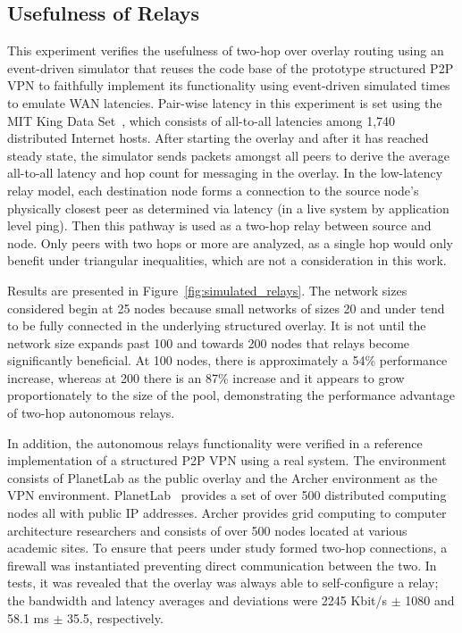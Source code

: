 \subsection{Usefulness of Relays}
This experiment verifies the usefulness of two-hop over overlay routing using
an event-driven simulator that reuses the code base of the prototype structured
P2P VPN to faithfully implement its functionality using event-driven simulated
times to emulate WAN latencies.  Pair-wise latency in this experiment is set
using the MIT King Data Set~\cite{king_data}, which consists of all-to-all
latencies among 1,740 distributed Internet hosts.  After starting the overlay
and after it has reached steady state, the simulator sends packets amongst all
peers to derive the average all-to-all latency and hop count for messaging in
the overlay.  In the low-latency relay model, each destination node forms a
connection to the source node's physically closest peer as determined via
latency (in a live system by application level ping).  Then this pathway is
used as a two-hop relay between source and node.  Only peers with two hops or
more are analyzed, as a single hop would only benefit under triangular
inequalities, which are not a consideration in this work.

Results are presented in Figure~\ref{fig:simulated_relays}. The network sizes
considered begin at 25 nodes because small networks of sizes 20 and under tend
to be fully connected in the underlying structured overlay.  It is not until
the network size expands past 100 and towards 200 nodes that relays become
significantly beneficial.  At 100 nodes, there is approximately a 54\%
performance increase, whereas at 200 there is an 87\% increase and it appears
to grow proportionately to the size of the pool, demonstrating the performance
advantage of two-hop autonomous relays.

In addition, the autonomous relays functionality were verified in a reference
implementation of a structured P2P VPN using a real system.  The environment
consists of PlanetLab as the public overlay and the Archer environment as the
VPN environment.  PlanetLab~\cite{planetlab} provides a set of over 500
distributed computing nodes all with public IP addresses.  Archer provides grid
computing to computer architecture researchers and consists of over 500 nodes
located at various academic sites.  To ensure that peers under study formed
two-hop connections, a firewall was instantiated preventing direct communication
between the two.  In tests, it was revealed that the overlay was always able to
self-configure a relay; the bandwidth and latency averages and deviations were
2245 Kbit/s $\pm$ 1080 and 58.1 ms $\pm$ 35.5, respectively.

